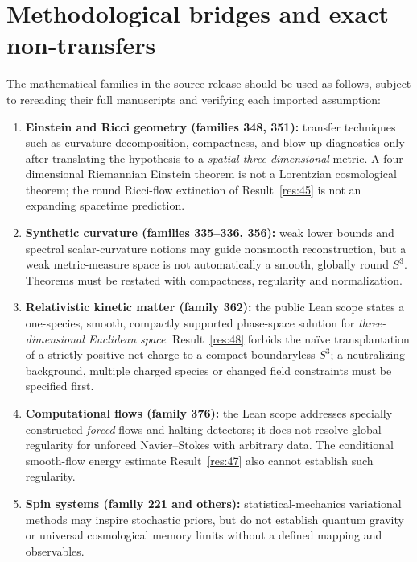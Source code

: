 \documentclass[aps,prd,onecolumn,notitlepage,groupedaddress,11pt]{revtex4-2}
\begin{document}
\section{Methodological bridges and exact non-transfers}
The mathematical families in the source release should be used as follows, subject to rereading their full manuscripts and verifying each imported assumption:
\begin{enumerate}
\item \textbf{Einstein and Ricci geometry (families 348, 351):} transfer techniques such as curvature decomposition, compactness, and blow-up diagnostics only after translating the hypothesis to a \emph{spatial three-dimensional} metric. A four-dimensional Riemannian Einstein theorem is not a Lorentzian cosmological theorem; the round Ricci-flow extinction of Result~\ref{res:45} is not an expanding spacetime prediction.
\item \textbf{Synthetic curvature (families 335--336, 356):} weak lower bounds and spectral scalar-curvature notions may guide nonsmooth reconstruction, but a weak metric-measure space is not automatically a smooth, globally round $S^3$. Theorems must be restated with compactness, regularity and normalization.
\item \textbf{Relativistic kinetic matter (family 362):} the public Lean scope states a one-species, smooth, compactly supported phase-space solution for \emph{three-dimensional Euclidean space}. Result~\ref{res:48} forbids the naïve transplantation of a strictly positive net charge to a compact boundaryless $S^3$; a neutralizing background, multiple charged species or changed field constraints must be specified first.
\item \textbf{Computational flows (family 376):} the Lean scope addresses specially constructed \emph{forced} flows and halting detectors; it does not resolve global regularity for unforced Navier--Stokes with arbitrary data. The conditional smooth-flow energy estimate Result~\ref{res:47} also cannot establish such regularity.
\item \textbf{Spin systems (family 221 and others):} statistical-mechanics variational methods may inspire stochastic priors, but do not establish quantum gravity or universal cosmological memory limits without a defined mapping and observables.
\end{enumerate}
\end{document}

